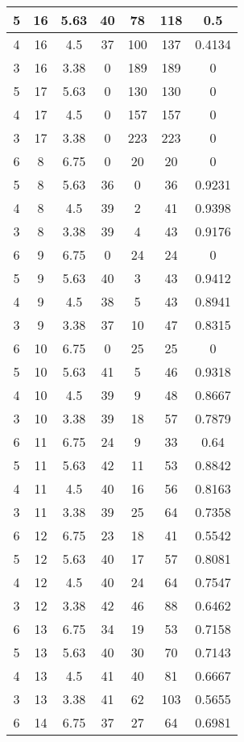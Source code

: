 \documentclass[letterpaper, 12pt]{article}
\begin{document}
\begin{longtable}{|c|c|c|c|c|c|c|}
\hline
5 & 16 & 5.63 & 40 & 78 & 118 & 0.5 \\
\hline
4 & 16 & 4.5 & 37 & 100 & 137 & 0.4134 \\
\hline
3 & 16 & 3.38 & 0 & 189 & 189 & 0 \\
\hline
5 & 17 & 5.63 & 0 & 130 & 130 & 0 \\
\hline
4 & 17 & 4.5 & 0 & 157 & 157 & 0 \\
\hline
3 & 17 & 3.38 & 0 & 223 & 223 & 0 \\
\hline
6 & 8 & 6.75 & 0 & 20 & 20 & 0 \\
\hline
5 & 8 & 5.63 & 36 & 0 & 36 & 0.9231 \\
\hline
4 & 8 & 4.5 & 39 & 2 & 41 & 0.9398 \\
\hline
3 & 8 & 3.38 & 39 & 4 & 43 & 0.9176 \\
\hline
6 & 9 & 6.75 & 0 & 24 & 24 & 0 \\
\hline
5 & 9 & 5.63 & 40 & 3 & 43 & 0.9412 \\
\hline
4 & 9 & 4.5 & 38 & 5 & 43 & 0.8941 \\
\hline
3 & 9 & 3.38 & 37 & 10 & 47 & 0.8315 \\
\hline
6 & 10 & 6.75 & 0 & 25 & 25 & 0 \\
\hline
5 & 10 & 5.63 & 41 & 5 & 46 & 0.9318 \\
\hline
4 & 10 & 4.5 & 39 & 9 & 48 & 0.8667 \\
\hline
3 & 10 & 3.38 & 39 & 18 & 57 & 0.7879 \\
\hline
6 & 11 & 6.75 & 24 & 9 & 33 & 0.64 \\
\hline
5 & 11 & 5.63 & 42 & 11 & 53 & 0.8842 \\
\hline
4 & 11 & 4.5 & 40 & 16 & 56 & 0.8163 \\
\hline
3 & 11 & 3.38 & 39 & 25 & 64 & 0.7358 \\
\hline
6 & 12 & 6.75 & 23 & 18 & 41 & 0.5542 \\
\hline
5 & 12 & 5.63 & 40 & 17 & 57 & 0.8081 \\
\hline
4 & 12 & 4.5 & 40 & 24 & 64 & 0.7547 \\
\hline
3 & 12 & 3.38 & 42 & 46 & 88 & 0.6462 \\
\hline
6 & 13 & 6.75 & 34 & 19 & 53 & 0.7158 \\
\hline
5 & 13 & 5.63 & 40 & 30 & 70 & 0.7143 \\
\hline
4 & 13 & 4.5 & 41 & 40 & 81 & 0.6667 \\
\hline
3 & 13 & 3.38 & 41 & 62 & 103 & 0.5655 \\
\hline
6 & 14 & 6.75 & 37 & 27 & 64 & 0.6981 \\

\end{longtable}
\end{document}
